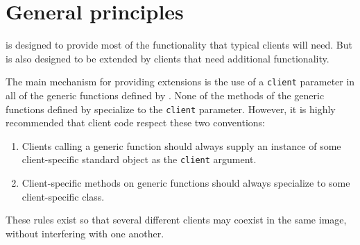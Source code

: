 \chapter{General principles}

\sysname{} is designed to provide most of the functionality that
typical clients will need.  But \sysname{} is also designed to be
extended by clients that need additional functionality.

The main mechanism for providing extensions is the use of a
\texttt{client} parameter in all of the generic functions defined by
\sysname{}.  None of the methods of the generic functions defined by
\sysname{} specialize to the \texttt{client} parameter.  However, it is
highly recommended that client code respect these two conventions:

\begin{enumerate}
\item Clients calling a \sysname{} generic function should always
  supply an instance of some client-specific standard object as the
  \texttt{client} argument.
\item Client-specific methods on \sysname{} generic functions should
  always specialize to some client-specific class.
\end{enumerate}

These rules exist so that several different clients may coexist in
the same \commonlisp{} image, without interfering with one another.
